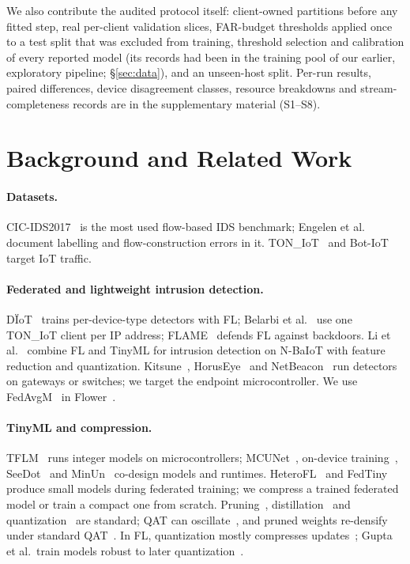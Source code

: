\documentclass[sigplan,10pt,review,anonymous,nonacm]{acmart}
\newcommand{\cic}{CIC-IDS2017\xspace}
\newcommand{\ton}{TON\_IoT\xspace}
\begin{document}
We also contribute the audited protocol itself: client-owned partitions before any fitted step,
real per-client validation slices, FAR-budget thresholds applied once to a test split that was excluded
from training, threshold selection and calibration of every reported model (its records had been in the
training pool of our earlier, exploratory pipeline; \S\ref{sec:data}), and an unseen-host split. Per-run
results, paired differences, device disagreement classes, resource breakdowns and stream-completeness
records are in the supplementary material (S1--S8).

\section{Background and Related Work}
\paragraph{Datasets.} \cic~\cite{sharafaldin2018toward} is the most used flow-based IDS benchmark;
Engelen et al.~\cite{engelen2021troubleshooting} document labelling and flow-construction errors in it.
\ton~\cite{moustafa2021toniot} and Bot-IoT~\cite{koroniotis2019botiot} target IoT traffic.

\paragraph{Federated and lightweight intrusion detection.} D\"IoT~\cite{nguyen2019diot} trains
per-device-type detectors with FL; Belarbi et al.~\cite{belarbi2023federated} use one \ton client per
IP address; FLAME~\cite{nguyen2022flame} defends FL against backdoors. Li et al.~\cite{li2025cognitive}
combine FL and TinyML for intrusion detection on N-BaIoT with feature reduction and quantization.
Kitsune~\cite{mirsky2018kitsune}, HorusEye~\cite{dong2023horuseye} and NetBeacon~\cite{zhou2023netbeacon}
run detectors on gateways or switches; we target the endpoint microcontroller. We use
FedAvgM~\cite{hsu2019measuring} in Flower~\cite{beutel2020flower}.

\paragraph{TinyML and compression.} TFLM~\cite{david2021tflm} runs integer models on
microcontrollers; MCUNet~\cite{lin2020mcunet}, on-device training~\cite{lin2022ondevice},
SeeDot~\cite{gopinath2019seedot} and MinUn~\cite{jaiswal2023minun} co-design models and runtimes.
HeteroFL~\cite{diao2021heterofl} and FedTiny~\cite{huang2023fedtiny} produce small models during
federated training; we compress a trained federated model or train a compact one from scratch.
Pruning~\cite{han2016deep}, distillation~\cite{hinton2015distilling,polino2018model} and
quantization~\cite{jacob2018quantization,gholami2021survey,nagel2021white} are standard; QAT can
oscillate~\cite{nagel2022overcoming}, and pruned weights re-densify under standard
QAT~\cite{tfmot2021collab}. In FL, quantization mostly compresses updates~\cite{reisizadeh2020fedpaq};
Gupta et al.\ train models robust to later quantization~\cite{gupta2023quantization}.
\end{document}
